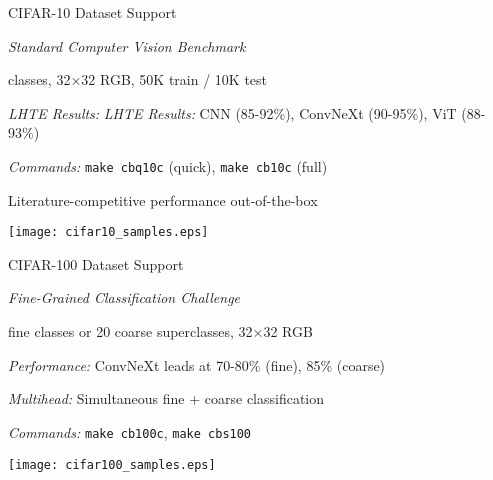 \begin{slide}[\slideopts,toc={CIFAR-10}]{CIFAR-10 Dataset Support}
  
  \emph{Standard Computer Vision Benchmark}
  
  \begin{itemize}
     classes, 32×32 RGB, 50K train / 10K test
    
    \mpitem \emph{LHTE Results:}
    \mpitem \emph{LHTE Results:} CNN (85-92\%), ConvNeXt (90-95\%), ViT (88-93\%)
    
    \mpitem \emph{Commands:} \texttt{make cbq10c} (quick), \texttt{make cb10c} (full)
    
    \mpitem Literature-competitive performance out-of-the-box
  \end{itemize}
  
  \vspace{0.5em}
  \centerline{\texttt{[image: cifar10\_samples.eps]}}
\end{slide}

\begin{slide}[\slideopts,toc={CIFAR-100}]{CIFAR-100 Dataset Support}
  
  \emph{Fine-Grained Classification Challenge}
  
  \begin{itemize}
     fine classes or 20 coarse superclasses, 32×32 RGB
    
    \mpitem \emph{Performance:} ConvNeXt leads at 70-80\% (fine), 85\% (coarse)
    
    \mpitem \emph{Multihead:} Simultaneous fine + coarse classification
    
    \mpitem \emph{Commands:} \texttt{make cb100c}, \texttt{make cbs100}
  \end{itemize}
  
  \vspace{0.5em}
  \centerline{\texttt{[image: cifar100\_samples.eps]}}
\end{slide}

